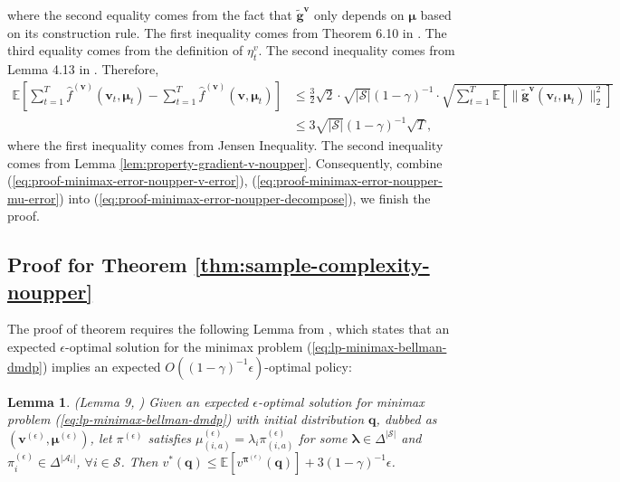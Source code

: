 \documentclass[12pt]{article}
\newtheorem{lemma}{Lemma}
\begin{document}
where the second equality comes from the fact that $\tilde{\boldsymbol{g}}^{\boldsymbol{v}}$ only depends on $\boldsymbol{\mu}$ based on its construction rule. The first inequality comes from Theorem 6.10 in \cite{orabona2019modern}. The third equality comes from the definition of $\eta_t^{v}$. The second inequality comes from Lemma 4.13 in \cite{orabona2019modern}. Therefore,
\begin{equation}
\begin{aligned}
\mathbb{E} \left[ \sum_{t=1}^T \hat{f}^{(\boldsymbol{v})}(\boldsymbol{v}_t,\boldsymbol{\mu}_t)- \sum_{t=1}^T \hat{f}^{(\boldsymbol{v})}(\boldsymbol{v},\boldsymbol{\mu}_t)\right] & \le \frac{3}{2} \sqrt{2} \cdot \sqrt{|\mathcal{S}|} (1-\gamma)^{-1} \cdot    \sqrt{\sum_{t=1}^T \mathbb{E}\left[\|\tilde{\boldsymbol{g}}^{\boldsymbol{v}}(\boldsymbol{v}_t,\boldsymbol{\mu}_t)\|_2^2\right]} \\
& \le 3 \sqrt{|\mathcal{S}|} (1-\gamma)^{-1} \sqrt{T},
\end{aligned}
\label{eq:proof-minimax-error-noupper-v-error}
\end{equation}
where the first inequality comes from Jensen Inequality. The second inequality comes from Lemma \ref{lem:property-gradient-v-noupper}. Consequently, combine (\ref{eq:proof-minimax-error-noupper-v-error}), (\ref{eq:proof-minimax-error-noupper-mu-error}) into (\ref{eq:proof-minimax-error-noupper-decompose}), we finish the proof.

\subsection{Proof for Theorem \ref{thm:sample-complexity-noupper}}

\label{sec:app-pf-sample-complexity}

The proof of theorem requires the following Lemma from \cite{jin2020efficiently}, which states that an expected $\epsilon$-optimal solution for the minimax problem (\ref{eq:lp-minimax-bellman-dmdp}) implies an expected $O((1-\gamma)^{-1}\epsilon)$-optimal policy:

\begin{lemma}{(Lemma 9, \cite{jin2020efficiently})}
    Given an expected $\epsilon$-optimal solution for minimax problem (\ref{eq:lp-minimax-bellman-dmdp}) with initial distribution $\boldsymbol{q}$, dubbed as $(\boldsymbol{v}^{(\epsilon)},\boldsymbol{\mu}^{(\epsilon)})$, let $\pi^{(\epsilon)}$ satisfies $\mu_{(i,a)}^{(\epsilon)} = \lambda_i \pi_{(i,a)}^{(\epsilon)}$ for some $\boldsymbol{\lambda} \in \Delta^{|\mathcal{S}|}$ and $\pi_i^{(\epsilon)} \in \Delta^{|\mathcal{A}_i|}$, $\forall i \in \mathcal{S}$.
    Then $ v^*(\boldsymbol{q}) \le \mathbb{E}[v^{\boldsymbol{\pi}^{(\epsilon)}}(\boldsymbol{q})]  + 3  (1-\gamma)^{-1} \epsilon$.
    \label{lem:solution-to-policy}
\end{lemma}
\end{document}
